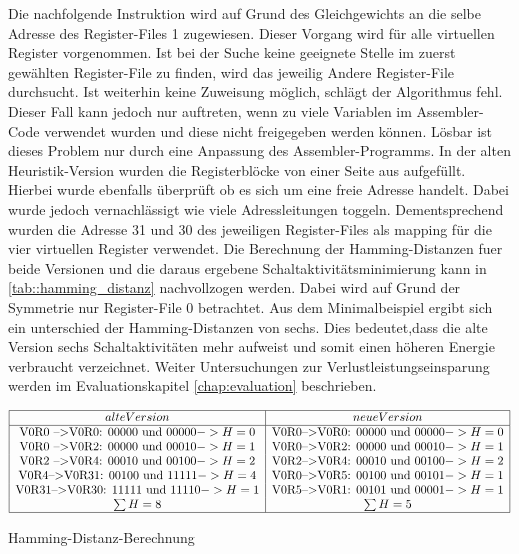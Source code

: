 Die nachfolgende Instruktion wird auf Grund des Gleichgewichts an die selbe Adresse des Register-Files 1 zugewiesen. Dieser Vorgang wird für alle virtuellen Register vorgenommen. Ist bei der Suche keine geeignete Stelle im zuerst gewählten Register-File zu finden, wird das jeweilig Andere Register-File durchsucht. Ist weiterhin keine Zuweisung möglich, schlägt der Algorithmus fehl. Dieser Fall kann jedoch nur auftreten, wenn zu viele Variablen im Assembler-Code verwendet wurden und diese nicht freigegeben werden können. Lösbar ist dieses Problem nur durch eine Anpassung des Assembler-Programms.
In der alten Heuristik-Version wurden die Registerblöcke von einer Seite aus aufgefüllt. Hierbei wurde ebenfalls überprüft ob es sich um eine freie Adresse handelt. Dabei wurde jedoch vernachlässigt wie viele Adressleitungen toggeln. Dementsprechend wurden die Adresse 31 und 30 des jeweiligen Register-Files als mapping für die vier virtuellen Register verwendet.
Die Berechnung der Hamming-Distanzen fuer beide Versionen und die daraus ergebene Schaltaktivitätsminimierung kann in \ref{tab::hamming_distanz} nachvollzogen werden. Dabei wird auf Grund der Symmetrie nur Register-File 0 betrachtet.
Aus dem Minimalbeispiel ergibt sich ein unterschied der Hamming-Distanzen von sechs. Dies bedeutet,dass die alte Version sechs Schaltaktivitäten mehr aufweist und somit einen höheren Energie verbraucht verzeichnet. Weiter Untersuchungen zur Verlustleistungseinsparung werden im Evaluationskapitel \ref{chap:evaluation} beschrieben.

\begin{table}
	\centering
	$ \begin{array}{|c|c|}
	\hline
	alte Version & neue Version \\
	\hline
\text{V0R0 -->V0R0: } 00000 \text{ und } 00000 -> H= 0 &\text{V0R0-->V0R0: } 00000 \text{ und } 00000 -> H= 0\\
\text{V0R0 -->V0R2: } 00000 \text{ und } 00010 -> H= 1 &\text{V0R0-->V0R2: } 00000 \text{ und } 00010 -> H= 1 \\
\text{V0R2 -->V0R4: } 00010 \text{ und } 00100 -> H= 2 &\text{V0R2-->V0R4: } 00010 \text{ und } 00100 -> H= 2 \\
\text{V0R4-->V0R31: } 00100 \text{ und } 11111 -> H= 4 &\text{V0R0-->V0R5: } 00100 \text{ und } 00101 -> H= 1 \\
\text{V0R31-->V0R30: } 11111 \text{ und } 11110 -> H= 1 &\text{V0R5-->V0R1: } 00101 \text{ und } 00001 -> H= 1 \\
	\sum H=8 &\sum H=5 \\
	\hline
	\end{array} $
	\caption{Hamming-Distanz-Berechnung}
	\label{tab::hamming_distanz}
\end{table}


